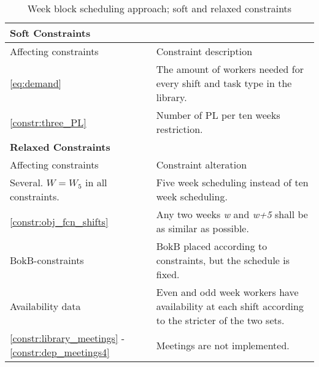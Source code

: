 \begin{table}[!h]
\centering
\caption{Week block scheduling approach; soft and relaxed constraints}
\label{tab:weekly_task_constraints}
\begin{tabular}{|p{4cm}|p{7cm}|}
\hline
\multicolumn{2}{|l|}{\cellcolor{gray!90} \textbf{Soft Constraints}} \\
\hline 
\rowcolor{Gray} Affecting constraints & Constraint description \\ \hline
\ref{eq:demand} & The amount of workers needed for every shift and task type in the library.  \\ \hline
\ref{constr:three_PL} & Number of PL per ten weeks restriction. \\ \hline
\multicolumn{2}{|l|}{\cellcolor{gray!90} \textbf{Relaxed Constraints}} \\
\hline 
\rowcolor{Gray} Affecting constraints & Constraint alteration \\ \hline
Several. $W = W_5$ in all constraints. & Five week scheduling instead of ten week scheduling. \\ \hline
\ref{constr:obj_fcn_shifts} & Any two weeks \textit{w} and \textit{w+5} shall be as similar as possible. \\ \hline
BokB-constraints & BokB placed according to constraints, but the schedule is fixed. \\ \hline
Availability data & Even and odd week workers have availability at each shift according to the stricter of the two sets. \\ \hline
\ref{constr:library_meetings} - \ref{constr:dep_meetings4} & Meetings are not implemented. \\ \hline
\end{tabular}
\end{table}


